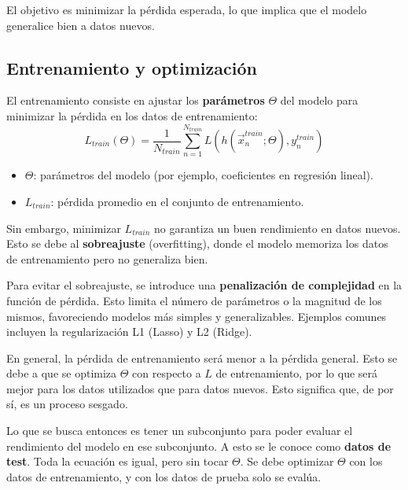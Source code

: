 El objetivo es minimizar la pérdida esperada, lo que implica que el modelo generalice bien a datos nuevos.

\subsection{Entrenamiento y optimización}
El entrenamiento consiste en ajustar los \textbf{parámetros} $\Theta$ del modelo para minimizar la pérdida en los datos de entrenamiento:
$$L_{train}(\Theta) = \frac{1}{N_{train}} \sum^{N_{train}}_{n=1} L(h(\vec{x}^{train}_n; \Theta), y^{train}_n)$$
\begin{itemize}
\item $\Theta$: parámetros del modelo (por ejemplo, coeficientes en regresión lineal).
\item $L_{train}$: pérdida promedio en el conjunto de entrenamiento.
\end{itemize}

Sin embargo, minimizar $L_{train}$ no garantiza un buen rendimiento en datos nuevos. Esto se debe al \textbf{sobreajuste} (overfitting), donde el modelo memoriza los datos de entrenamiento pero no generaliza bien. 

Para evitar el sobreajuste, se introduce una \textbf{penalización de complejidad} en la función de pérdida. Esto limita el número de parámetros o la magnitud de los mismos, favoreciendo modelos más simples y generalizables. Ejemplos comunes incluyen la regularización L1 (Lasso) y L2 (Ridge).

En general, la pérdida de entrenamiento será menor a la pérdida general. Esto se debe a que se optimiza $\Theta$ con respecto a $L$ de entrenamiento, por lo que será mejor para los datos utilizados que para datos nuevos. Esto significa que, de por sí, es un proceso sesgado. 

Lo que se busca entonces es tener un subconjunto para poder evaluar el rendimiento del modelo en ese subconjunto. A esto se le conoce como \textbf{datos de test}. Toda la ecuación es igual, pero sin tocar $\Theta$. Se debe optimizar $\Theta$ con los datos de entrenamiento, y con los datos de prueba solo se evalúa. 


